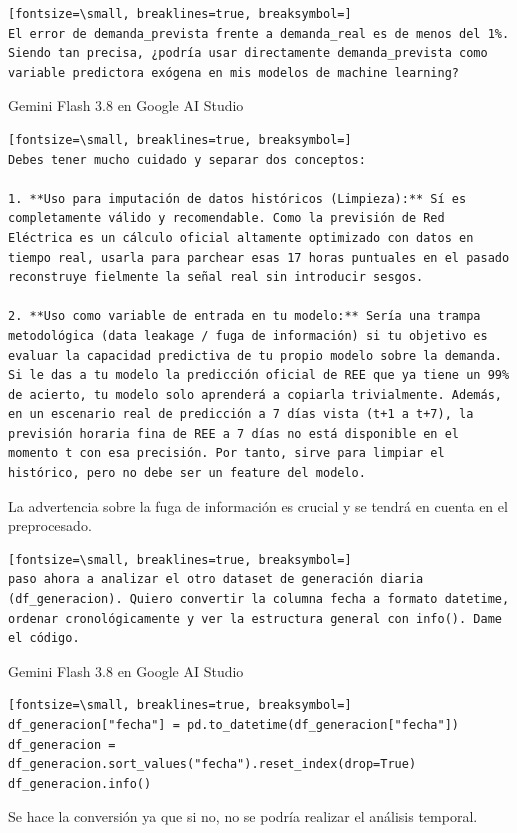 \documentclass[12pt,a4paper,oneside]{book}
\begin{document}
\begin{iaprompt}
\begin{Verbatim}[fontsize=\small, breaklines=true, breaksymbol=]
El error de demanda_prevista frente a demanda_real es de menos del 1%. Siendo tan precisa, ¿podría usar directamente demanda_prevista como variable predictora exógena en mis modelos de machine learning?
\end{Verbatim}
\end{iaprompt}
\begin{iaresp}{Gemini Flash 3.8 en Google AI Studio}
\begin{Verbatim}[fontsize=\small, breaklines=true, breaksymbol=]
Debes tener mucho cuidado y separar dos conceptos:

1. **Uso para imputación de datos históricos (Limpieza):** Sí es completamente válido y recomendable. Como la previsión de Red Eléctrica es un cálculo oficial altamente optimizado con datos en tiempo real, usarla para parchear esas 17 horas puntuales en el pasado reconstruye fielmente la señal real sin introducir sesgos.

2. **Uso como variable de entrada en tu modelo:** Sería una trampa metodológica (data leakage / fuga de información) si tu objetivo es evaluar la capacidad predictiva de tu propio modelo sobre la demanda. Si le das a tu modelo la predicción oficial de REE que ya tiene un 99% de acierto, tu modelo solo aprenderá a copiarla trivialmente. Además, en un escenario real de predicción a 7 días vista (t+1 a t+7), la previsión horaria fina de REE a 7 días no está disponible en el momento t con esa precisión. Por tanto, sirve para limpiar el histórico, pero no debe ser un feature del modelo.
\end{Verbatim}
\end{iaresp}
\begin{iaanalisis}
La advertencia sobre la fuga de información es crucial y se tendrá en cuenta en el preprocesado.
\end{iaanalisis}


\begin{iaprompt}
\begin{Verbatim}[fontsize=\small, breaklines=true, breaksymbol=]
paso ahora a analizar el otro dataset de generación diaria (df_generacion). Quiero convertir la columna fecha a formato datetime, ordenar cronológicamente y ver la estructura general con info(). Dame el código.
\end{Verbatim}
\end{iaprompt}
\begin{iaresp}{Gemini Flash 3.8 en Google AI Studio}
\begin{Verbatim}[fontsize=\small, breaklines=true, breaksymbol=]
df_generacion["fecha"] = pd.to_datetime(df_generacion["fecha"])
df_generacion = df_generacion.sort_values("fecha").reset_index(drop=True)
df_generacion.info()
\end{Verbatim}
\end{iaresp}
\begin{iaanalisis}
Se hace la conversión ya que si no, no se podría realizar el análisis temporal.
\end{iaanalisis}
\end{document}
